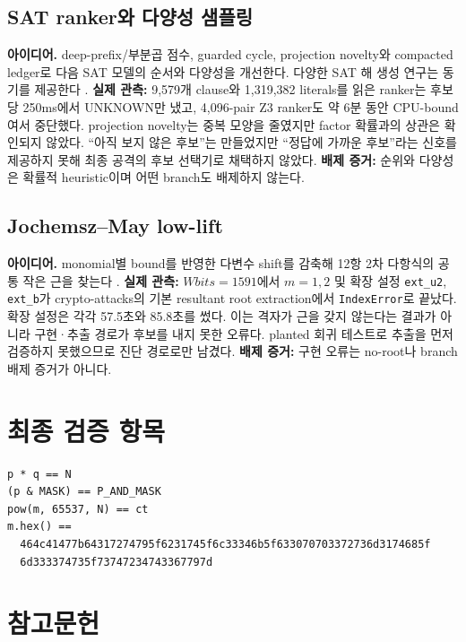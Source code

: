 \documentclass[10pt,a4paper]{article}
\newcommand{\evidence}[1]{\textbf{배제 증거:} #1}
\newcommand{\observed}[1]{\textbf{실제 관측:} #1}
\begin{document}
\subsection{SAT ranker와 다양성 샘플링}

\textbf{아이디어.} deep-prefix/부분곱 점수, guarded cycle, projection
novelty와 compacted ledger로 다음 SAT 모델의 순서와 다양성을 개선한다.
다양한 SAT 해 생성 연구는 동기를 제공한다 \cite{nadel}.
\observed{9,579개 clause와 1,319,382 literals를 읽은 ranker는 후보당
250ms에서 UNKNOWN만 냈고, 4,096-pair Z3 ranker도 약 6분 동안
CPU-bound여서 중단했다. projection novelty는 중복 모양을 줄였지만
factor 확률과의 상관은 확인되지 않았다.}
``아직 보지 않은 후보''는 만들었지만 ``정답에 가까운 후보''라는 신호를
제공하지 못해 최종 공격의 후보 선택기로 채택하지 않았다.
\evidence{순위와 다양성은 확률적 heuristic이며 어떤 branch도
배제하지 않는다.}

\subsection{Jochemsz--May low-lift}

\textbf{아이디어.} monomial별 bound를 반영한 다변수 shift를 감축해
12항 2차 다항식의 공통 작은 근을 찾는다
\cite{jochemsz-may,crypto-attacks}.
\observed{\(Wbits=1591\)에서 \(m=1,2\) 및 확장 설정
\texttt{ext\_u2}, \texttt{ext\_b}가 crypto-attacks의 기본 resultant
root extraction에서 \texttt{IndexError}로 끝났다. 확장 설정은 각각
57.5초와 85.8초를 썼다.}
이는 격자가 근을 갖지 않는다는 결과가 아니라 구현·추출 경로가 후보를
내지 못한 오류다. planted 회귀 테스트로 추출을 먼저 검증하지 못했으므로
진단 경로로만 남겼다.
\evidence{구현 오류는 no-root나 branch 배제 증거가 아니다.}

\section{최종 검증 항목}

\begin{lstlisting}
p * q == N
(p & MASK) == P_AND_MASK
pow(m, 65537, N) == ct
m.hex() ==
  464c41477b64317274795f6231745f6c33346b5f633070703372736d3174685f
  6d333374735f73747234743367797d
\end{lstlisting}

\section{참고문헌}
\end{document}
